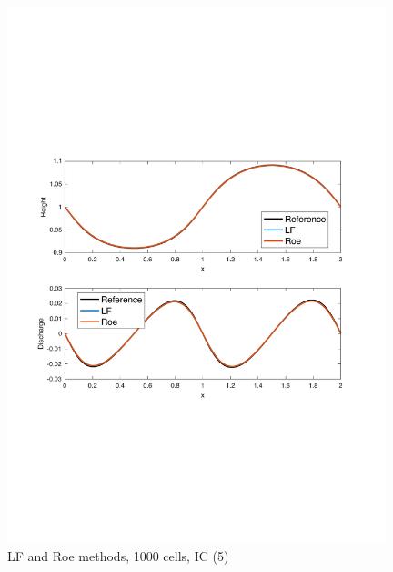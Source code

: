 \documentclass[11pt,a4paper]{article}
\begin{document}
\begin{figure}[!htb]
    \centering
    \includegraphics[width=11cm]{pictures/IC_2_1000_cells.pdf}
    \caption{LF and Roe methods, 1000 cells, IC (5)}
    \label{fig:IC_2_1000_cells}
\end{figure}
\end{document}
